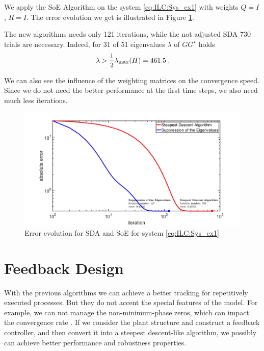 \begin{exam}
	We apply the SoE Algorithm on the system \eqref{eq:ILC:Sys_ex1} with weights $Q = I$, $R = I$.  
	The error evolution we get is illustrated in Figure \ref{img:ILC:Ex1_SDAvsSoE}.
	
	The new algorithms needs only 121 iterations, while the not adjusted SDA 730 trials are necessary. Indeed, for 31 of 51 eigenvalues $\lambda$ of $G G^\star$ holds 
	\begin{align}
	\lambda > \frac{1}{2}\lambda_{\mathrm{max}}(H) = 461.5 \, .
	\end{align}
	
	We can also see the influence of the weighting matrices on the convergence speed. 
	Since we do not need the better performance at the first time steps, we also need much less iterations. 
	   		
	\begin{figure}[ht]
		\centering
		\includegraphics[width=\textwidth]{fig/Ex1_SDAvsSoE.jpg}
		\caption{Error evolution for SDA and SoE for system \eqref{eq:ILC:Sys_ex1}}
		\label{img:ILC:Ex1_SDAvsSoE}
	\end{figure}
	
\end{exam}

\section{Feedback Design}

With the previous algorithms we can achieve a better tracking for repetitively executed processes.  But they do not accent the special features of the model. For example, we can not manage the non-minimum-phase zeros, which can impact the convergence rate \cite{ILC}. 
If we consider the plant structure and construct a feedback controller, and then convert it into a steepest descent-like algorithm, we possibly can achieve better performance and robustness properties. 

